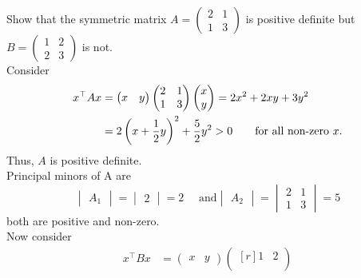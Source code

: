 \documentclass[12pt,class=book,crop=false]{standalone}
\begin{document}
\begin{ex}
    Show that the symmetric matrix $ A=\begin{pmatrix}
            2 & 1 \\
            1 & 3
        \end{pmatrix} $ is positive definite but $ B=\begin{pmatrix}
            1 & 2 \\
            2 & 3
        \end{pmatrix} $ is not.\\


    Consider
    \begin{align*}
        x^\top Ax & =\begin{pmatrix}
            x & y
        \end{pmatrix}\begin{pmatrix*}[r]
            2 & 1\\
            1 & 3
        \end{pmatrix*}\begin{pmatrix}
            x \\
            y
        \end{pmatrix}= 2x^2+2xy+3y^2 \\
                  & = 2\left(x+\frac{1}{2}y\right)^2+\frac{5}{2}y^2>0 \qquad\text{for all non-zero $ x $.}
    \end{align*}
    Thus, $ A $ is positive definite.\\
    Principal minors of A are
    \[
        \begin{vmatrix}
            A_1
        \end{vmatrix}=\begin{vmatrix}
            2
        \end{vmatrix}=2 \quad \text{ and} \begin{vmatrix}
            A_2
        \end{vmatrix}=\begin{vmatrix}
            2 & 1 \\
            1 & 3
        \end{vmatrix}=5
    \]
    both are positive and non-zero.\\
    Now consider
    \begin{align*}
        x^\top Bx & =\begin{pmatrix}
            x & y
        \end{pmatrix}\begin{pmatrix*}[r]
            1 & 2\\

\end{pmatrix*}
\end{align*}
\end{ex}
\end{document}
